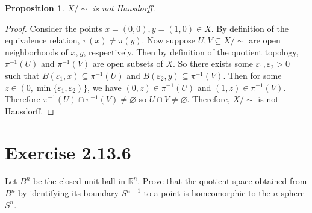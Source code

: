\documentclass[12pt]{article}
\newtheorem{proposition}{Proposition}
\newenvironment{problem}
    {\begin{lrbox}{\mybox}\begin{minipage}{\textwidth-10pt}}
    {\end{minipage}\end{lrbox}\framebox[6.5in]{\usebox{\mybox}}}
\newcommand{\R}{\mathbb{R}}
\let\eps\varepsilon
\let\emptyset\varnothing
\begin{document}
\begin{proposition}
    $X/\sim$ is not Hausdorff.
\end{proposition}
    
\begin{proof}
    Consider the points $x=(0,0),y=(1,0)\in X$. By definition of the equivalence relation, $\pi(x)\ne\pi(y)$. Now suppose $U,V\subseteq X/\sim$ are open neighborhoods of $x,y$, respectively. Then by definition of the quotient topology, $\pi^{-1}(U)$ and $\pi^{-1}(V)$ are open subsets of $X$. So there exists some $\eps_1,\eps_2>0$ such that $B(\eps_1,x)\subseteq\pi^{-1}(U)$ and $B(\eps_2,y)\subseteq\pi^{-1}(V)$. Then for some $z\in(0,\min\{\eps_1,\eps_2)\}$, we have $(0,z)\in\pi^{-1}(U)$ and $(1,z)\in\pi^{-1}(V)$. Therefore $\pi^{-1}(U)\cap\pi^{-1}(V) \ne\emptyset$ so $U\cap V\ne \emptyset$. Therefore, $X/\sim$ is not Hausdorff.
    
\end{proof}

\section*{Exercise 2.13.6}
\begin{problem}
    Let $B^n$ be the closed unit ball in $\R^n$. Prove that the quotient space obtained from $B^n$ by identifying its boundary $S^{n-1}$ to a point is homeomorphic to the $n$-sphere $S^n$.
\end{problem}
\end{document}
